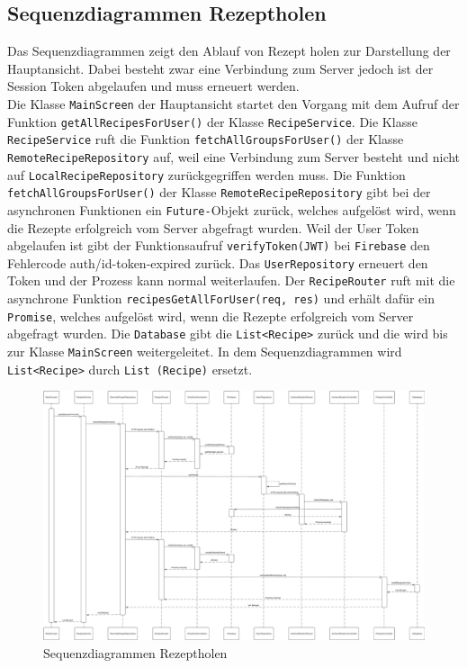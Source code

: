 \documentclass{entwurfsheft}
\begin{document}
\begin{sloppypar}
    \subsection{Sequenzdiagrammen Rezeptholen}
            Das Sequenzdiagrammen zeigt den Ablauf von Rezept holen zur Darstellung der Hauptansicht. Dabei besteht zwar eine Verbindung zum Server jedoch ist der Session Token abgelaufen und muss erneuert werden.\\
            Die Klasse \texttt{MainScreen} der Hauptansicht startet den Vorgang mit dem Aufruf der Funktion \texttt{getAllRecipesForUser()} der Klasse \texttt{RecipeService}. Die Klasse \texttt{RecipeService} ruft die Funktion \texttt{fetchAllGroupsForUser()} der Klasse \texttt{RemoteRecipeRepository} auf, weil eine Verbindung zum Server besteht und nicht auf \texttt{LocalRecipeRepository} zurückgegriffen werden muss. Die Funktion \texttt{fetchAllGroupsForUser()} der Klasse \texttt{RemoteRecipeRepository} gibt bei der asynchronen Funktionen ein \texttt{Future-}Objekt zurück, welches aufgelöst wird, wenn die Rezepte erfolgreich vom Server abgefragt wurden. Weil der User Token abgelaufen ist gibt der Funktionsaufruf \texttt{verifyToken(JWT)} bei \texttt{Firebase} den Fehlercode auth\slash id-token-expired zurück. Das \texttt{UserRepository} erneuert den Token und der Prozess kann normal weiterlaufen. Der \texttt{RecipeRouter} ruft mit die asynchrone Funktion \texttt{recipesGetAllForUser(req, res)} und erhält dafür ein \texttt{Promise}, welches aufgelöst wird, wenn die Rezepte erfolgreich vom Server abgefragt wurden. Die \texttt{Database} gibt die \texttt{List<Recipe>} zurück und die wird bis zur Klasse \texttt{MainScreen} weitergeleitet. In dem Sequenzdiagrammen wird \texttt{List<Recipe>} durch \texttt{List (Recipe)} ersetzt.
        
        \begin{figure}[htp]
            \centering
            \includegraphics[width = \linewidth]{images/processDescription/SequenzdiagrammRecipeFetching.pdf}
            \caption{Sequenzdiagrammen Rezeptholen}
        \end{figure}


\end{sloppypar}
\end{document}
